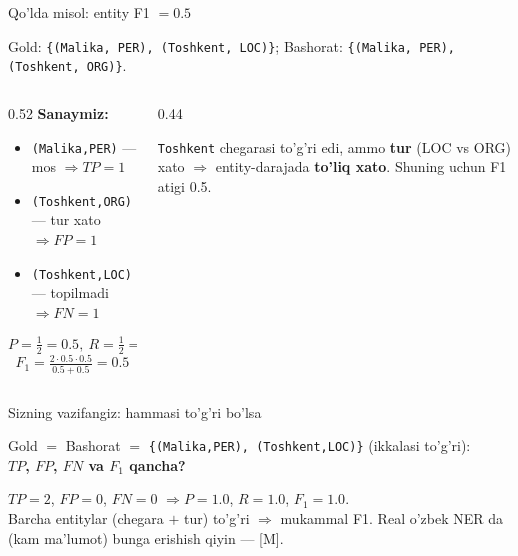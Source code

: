 \documentclass[aspectratio=169,11pt]{beamer}
\begin{document}
\begin{frame}{Qo'lda misol: entity F1 $=0.5$}
  \begin{tcolorbox}[defbox,title={Gold va bashorat entitylar}]
    \small
    Gold: \texttt{\{(Malika, PER), (Toshkent, LOC)\}}; \quad
    Bashorat: \texttt{\{(Malika, PER), (Toshkent, ORG)\}}.
  \end{tcolorbox}
  \vspace{0.2em}
  \begin{columns}[T]
    \begin{column}{0.52\textwidth}
      \textbf{Sanaymiz:}
      \begin{itemize}\footnotesize\setlength\itemsep{1pt}
        \item \texttt{(Malika,PER)} --- mos $\Rightarrow TP=1$
        \item \texttt{(Toshkent,ORG)} --- tur xato $\Rightarrow FP=1$
        \item \texttt{(Toshkent,LOC)} --- topilmadi $\Rightarrow FN=1$
      \end{itemize}
      $$ P=\tfrac{1}{2}=0.5,\ R=\tfrac{1}{2}=0.5 $$
      $$ F_1=\tfrac{2\cdot0.5\cdot0.5}{0.5+0.5}=\mathbf{0.5} $$
    \end{column}
    \begin{column}{0.44\textwidth}
      \begin{tcolorbox}[okbox,top=2pt,bottom=2pt]
        \footnotesize
        \texttt{Toshkent} chegarasi to'g'ri edi, ammo \textbf{tur} (LOC vs ORG) xato
        $\Rightarrow$ entity-darajada \textbf{to'liq xato}. Shuning uchun F1 atigi 0.5.
      \end{tcolorbox}
    \end{column}
  \end{columns}
\end{frame}

\begin{frame}{Sizning vazifangiz: hammasi to'g'ri bo'lsa}
  \begin{tcolorbox}[warnbox,title=Savol --- 60 soniya]
    \small
    Gold $=$ Bashorat $=$ \texttt{\{(Malika,PER), (Toshkent,LOC)\}} (ikkalasi to'g'ri):\\[4pt]
    \textbf{\large $TP$, $FP$, $FN$ va $F_1$ qancha?}
  \end{tcolorbox}
  \pause
  \begin{tcolorbox}[okbox,title=Javob]
    \small
    $TP=2$, $FP=0$, $FN=0$ $\Rightarrow P=1.0$, $R=1.0$, $F_1=\mathbf{1.0}$.\\[3pt]
    \footnotesize Barcha entitylar (chegara $+$ tur) to'g'ri $\Rightarrow$ mukammal F1.
    Real o'zbek NER da (kam ma'lumot) bunga erishish qiyin --- [M].
  \end{tcolorbox}
\end{frame}
\end{document}
